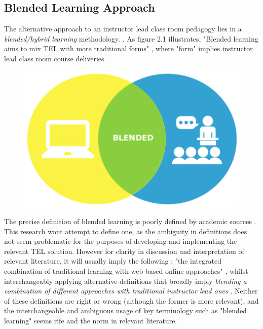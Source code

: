 \label{sec:sec01}
\subsection{Blended Learning Approach}
\label{subsec:subsec01}

The alternative approach to an instructor lead class room pedagogy lies in a \textit{blended/hybrid learning} methodology. \cite{Means2009,RickReis,Gordon2014}. As figure 2.1 illustrates, "Blended learning aims to mix TEL with more traditional forms" \cite{Gordon2014}, where "form" implies instructor lead class room course deliveries\cite{RickReis,Means2009}.

\begin{figure}[H]
	\centering
	\includegraphics[height=0.35\textheight]{figures/blendedLearning}
	\label{fig:Blended Learning}
\end{figure}

The precise definition of blended learning is poorly defined by academic sources \cite{Oliver2005}. This research wont attempt to define one, as the ambiguity in definitions does not seem problematic for the purposes of developing and implementing the relevant TEL solution. However for clarity in discussion and interpretation of relevant literature, it will usually imply the following ; "the integrated combination of traditional learning with web-based online approaches" \cite{Oliver2005}, whilst interchangeably applying alternative definitions that broadly imply \textit{blending a combination of different approaches with traditional instructor lead ones} \cite{Oliver2005,Sana2011}. Neither of these definitions are right or wrong (although the former is more relevant), and the interchangeable and ambiguous usage of key terminology such as "blended learning" seems rife and the norm in relevant literature\cite{Oliver2005,Sana2011}.

